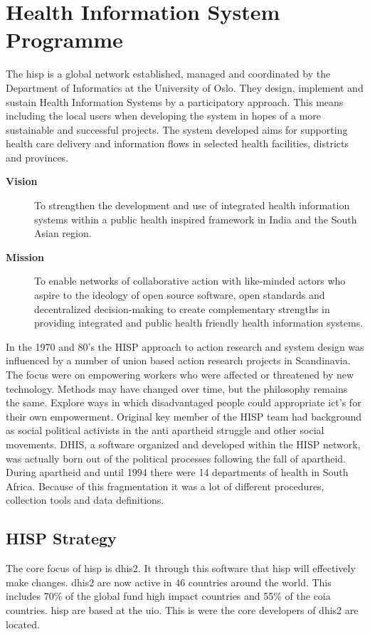 \cite{rw:snl}
\cite{rw:wiki}
\cite{hutututsi:wiki}

\section{Health Information System Programme}
The \gls{hisp} is a global network established, managed and coordinated by the Department of Informatics at the University of Oslo. They design, implement and sustain Health Information Systems by a participatory approach. This means including the local users when developing the system in hopes of a more sustainable and successful projects. The system developed aims for supporting health care delivery and information flows in selected health facilities, districts and provinces. 

\begin{description}
\item[\textbf{Vision}]To strengthen the development and use of integrated health information systems within a public health inspired framework in India and
the South Asian region.
\item[\textbf{Mission}]To enable networks of collaborative action with like-minded actors
who aspire to the ideology of open source software, open standards
and decentralized decision-making to create complementary strengths
in providing integrated and public health friendly health information
systems.
\end{description}

In the 1970 and 80's the HISP approach to action research and system design was influenced by a number of union based action research projects in Scandinavia. The focus were on empowering workers who were affected or threatened by new technology. Methods may have changed over time, but the philosophy remains the same. Explore ways in which disadvantaged people could appropriate \gls{ict}'s for their own empowerment. Original key member of the HISP team had background as social political activists in the anti apartheid struggle and other social movements. DHIS, a software organized and developed within the HISP network, was actually born out of the political processes  following the fall of apartheid. During apartheid and until 1994 there were 14 departments of health in South Africa. Because of this fragmentation it was a lot of different procedures, collection tools and data definitions.

\cite{hisp:uio}
\cite{historyhisp:uio}
\cite{abouthisp:india}

\subsection{HISP Strategy}
The core focus of \gls{hisp} is \gls{dhis2}. It through this software that \gls{hisp} will effectively make changes. \gls{dhis2} are now active in 46 countries around the world. This includes 70\% of the global fund high impact countries and 55\% of the \gls{coia} countries.
\gls{hisp} are based at the \gls{uio}. This is were the core developers of \gls{dhis2} are located. 

